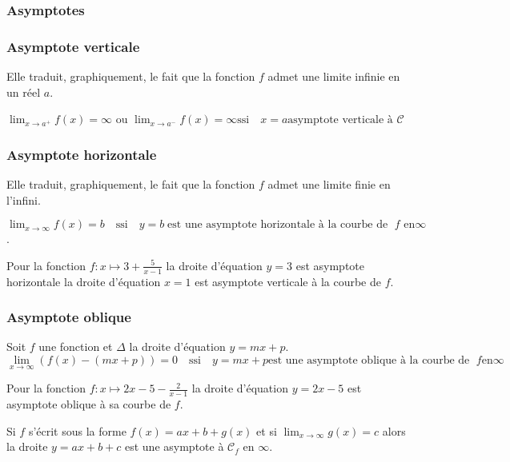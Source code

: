 \subsubsection{Asymptotes}
\subsubsection*{Asymptote verticale}
Elle traduit, graphiquement, le fait que la fonction $f$ admet une limite infinie en un réel $a$.


\begin{definition}
$\displaystyle\lim_{x \to a^{+}}f(x)=\infty$  ou 
$\displaystyle\lim_{x \to a^{-}}f(x)=\infty \text{ssi}\quad x=a \text{asymptote verticale à }\mathcal{C} $
\end{definition}



\subsubsection*{Asymptote horizontale}
Elle traduit, graphiquement, le fait que la fonction $f$ admet une limite finie en l'infini.



\begin{definition}
$\displaystyle \lim_{x \to \infty}f(x)=b \quad \text{ssi} \quad y = b \;  \text{est une  asymptote horizontale à  la courbe de }\; f \text{ en}  \infty$.
\end{definition}

\begin{example}
Pour la fonction $f : x\mapsto 3+ \frac{5}{x-1} $ 
la droite d'équation   $y = 3 $ est asymptote horizontale  la droite d'équation $x = 1$ est asymptote verticale à la courbe de $f.$

\end{example}

\subsubsection*{Asymptote oblique}
\begin{definition}
Soit $f$ une fonction et $ \Delta $ la droite d'équation  $y=mx+p$.
\[\displaystyle \lim_{x \to \infty}\left(f(x)-(mx+p)\right)=0 \quad\text{ssi} \quad y=mx+p \text{est une  asymptote oblique  à la courbe de }\; f \text{en} \infty \]
\end{definition}

\begin{example}
Pour la fonction $f : x\mapsto 2x-5- \frac{2}{x-1} $ 
la droite d'équation   $y = 2x-5 $ est asymptote oblique à sa courbe de $f$.
\end{example}
\begin{remark} 
Si $ f $ s'écrit sous la forme $ f(x)= ax+b + g(x) $ et si $ \displaystyle \lim_{x \to \infty}g(x)=c $  alors la droite $ y=ax+b+c $ est une asymptote à  $ \mathcal{C}_{f} $ en $ \infty. $


\end{remark}

